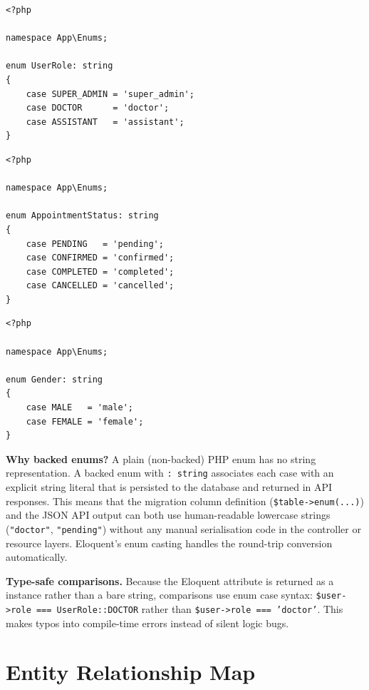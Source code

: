 \begin{lstlisting}[style=php, caption={app/Enums/UserRole.php.}, label={lst:enum-role}]
<?php

namespace App\Enums;

enum UserRole: string
{
    case SUPER_ADMIN = 'super_admin';
    case DOCTOR      = 'doctor';
    case ASSISTANT   = 'assistant';
}
\end{lstlisting}

\begin{lstlisting}[style=php, caption={app/Enums/AppointmentStatus.php.}, label={lst:enum-status}]
<?php

namespace App\Enums;

enum AppointmentStatus: string
{
    case PENDING   = 'pending';
    case CONFIRMED = 'confirmed';
    case COMPLETED = 'completed';
    case CANCELLED = 'cancelled';
}
\end{lstlisting}

\begin{lstlisting}[style=php, caption={app/Enums/Gender.php.}, label={lst:enum-gender}]
<?php

namespace App\Enums;

enum Gender: string
{
    case MALE   = 'male';
    case FEMALE = 'female';
}
\end{lstlisting}

\textbf{Why backed enums?} A plain (non-backed) PHP enum has no string
representation. A backed enum with \texttt{: string} associates each
case with an explicit string literal that is persisted to the database
and returned in API responses. This means that the migration column
definition (\texttt{\$table->enum(...)}) and the JSON API output can
both use human-readable lowercase strings (\texttt{"doctor"},
\texttt{"pending"}) without any manual serialisation code in the
controller or resource layers. Eloquent's enum casting handles the
round-trip conversion automatically.

\textbf{Type-safe comparisons.} Because the Eloquent attribute is
returned as a  instance rather than a bare string,
comparisons use enum case syntax:
\texttt{\$user->role === UserRole::DOCTOR} rather than
\texttt{\$user->role === 'doctor'}. This makes typos into compile-time
errors instead of silent logic bugs.

\section{Entity Relationship Map}
\label{sec:erd}

